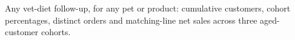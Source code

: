 Any vet-diet follow-up, for any pet or product: cumulative customers, cohort percentages, distinct orders and matching-line net sales across three aged-customer cohorts.
